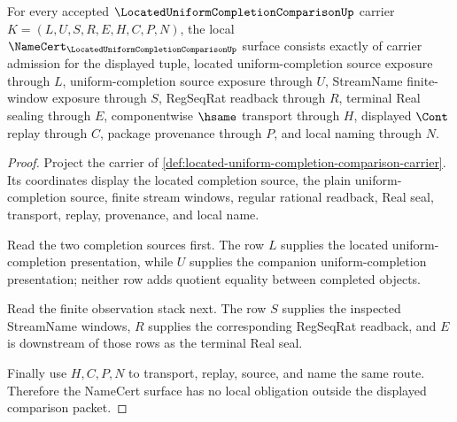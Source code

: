 \begin{theorem}
\label{thm:located-uniform-completion-comparison-namecert-obligations}
For every accepted $\LocatedUniformCompletionComparisonUp$ carrier $K=(L,U,S,R,E,H,C,P,N)$, the local $\NameCert_{\LocatedUniformCompletionComparisonUp}$ surface consists exactly of carrier admission for the displayed tuple, located uniform-completion source exposure through $L$, uniform-completion source exposure through $U$, StreamName finite-window exposure through $S$, RegSeqRat readback through $R$, terminal Real sealing through $E$, componentwise $\hsame$ transport through $H$, displayed $\Cont$ replay through $C$, package provenance through $P$, and local naming through $N$.
\end{theorem}
\begin{proof}
Project the carrier of \autoref{def:located-uniform-completion-comparison-carrier}. Its coordinates display the located completion source, the plain uniform-completion source, finite stream windows, regular rational readback, Real seal, transport, replay, provenance, and local name.

Read the two completion sources first. The row $L$ supplies the located uniform-completion presentation, while $U$ supplies the companion uniform-completion presentation; neither row adds quotient equality between completed objects.

Read the finite observation stack next. The row $S$ supplies the inspected StreamName windows, $R$ supplies the corresponding RegSeqRat readback, and $E$ is downstream of those rows as the terminal Real seal.

Finally use $H,C,P,N$ to transport, replay, source, and name the same route. Therefore the NameCert surface has no local obligation outside the displayed comparison packet.
\end{proof}


